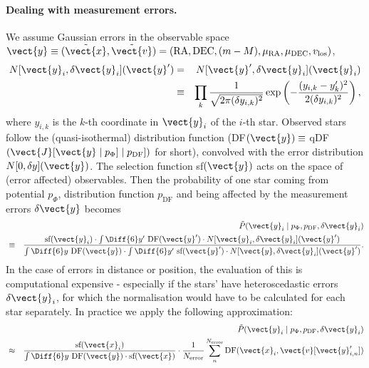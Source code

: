 
\paragraph{Dealing with measurement errors.} 

We assume Gaussian errors in the observable space $\vect{y} \equiv (\tilde{\vect{x}},\tilde{\vect{v}})=(\text{RA},\text{DEC},(m-M),\mu_\text{RA},\mu_\text{DEC},v_\text{los})$,
\begin{eqnarray*}
N[\vect{y}_i,\delta \vect{y}_i](\vect{y}') &=& N[\vect{y}',\delta \vect{y}_i](\vect{y}_i)\\ 
&\equiv&  \prod_k \frac{1}{\sqrt{2\pi(\delta {y}_{i,k})^2}} \exp\left( -\frac{(y_{i,k}-y_k')^2}{2(\delta y_{i,k})^2}\right),
\end{eqnarray*}
where $y_{i,k}$ is the $k$-th coordinate in $\vect{y}_i$ of the $i$-th star. Observed stars follow the (quasi-isothermal) distribution function (DF$(\vect{y}) \equiv$ qDF$(\vect{J}[\vect{y} \mid p_\Phi] \mid p_\text{DF}])$ for short), convolved with the error distribution $N[0,\delta y](\vect{y})$. The selection function sf$(\vect{y})$ acts on the space of (error affected) observables. 
Then the probability of one star coming from potential $p_\Phi$, distribution function $p_\text{DF}$ and being affected by the measurement errors $\delta \vect{y}$ becomes
\begin{eqnarray*}
&&\tilde{P}(\vect{y}_i \mid p_\Phi,p_\text{DF},\delta \vect{y}_i)\\
& \equiv& \frac{\text{sf}(\vect{y}_i) \cdot \int \Diff{6} y' \  \text{DF}(\vect{y}') \cdot N[\vect{y}_i,\delta \vect{y}_i](\vect{y}')}{\int \Diff{6}y  \  \text{DF}(\vect{y})  \cdot  \int \Diff{6} y' \  \text{sf}(\vect{y}')  \cdot N[\vect{y},\delta \vect{y}_i](\vect{y}')}.
\end{eqnarray*}
In the case of errors in distance or position, the evaluation of this is computational expensive - especially if the stars' have heteroscedastic errors $\delta \vect{y}_i$, for which the normalisation would have to be calculated for each star separately. In practice we apply the following approximation:
\begin{eqnarray}
&&\tilde{P}(\vect{y}_i \mid p_\Phi,p_\text{DF},\delta \vect{y}_i) \nonumber\\
&\approx& \frac{ \text{sf}(\vect{x}_i)}{\int \Diff{6}y  \  \text{DF}(\vect{y})  \cdot   \text{sf}(\vect{x})} \cdot \frac{1}{N_\text{error}} \sum_n^{N_\text{error}}  \text{DF}(\vect{x}_i,\vect{v}[\vect{y}'_{i,n}]) \label{eq:errorconv}
\end{eqnarray}

